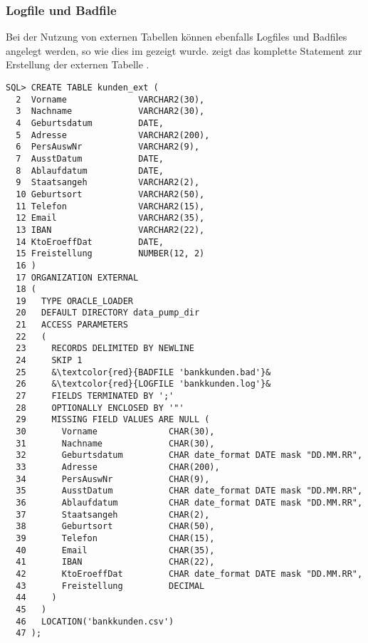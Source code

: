         \subsubsection{Logfile und Badfile}
          Bei der Nutzung von externen Tabellen k\"onnen ebenfalls Logfiles und Badfiles angelegt werden, so wie dies im  gezeigt wurde.  zeigt das komplette Statement zur Erstellung der externen Tabelle .
\clearpage
          \begin{lstlisting}[caption={Logfile und Badfile},label=admin929,language=oracle_sql]
SQL> CREATE TABLE kunden_ext (
  2  Vorname              VARCHAR2(30),
  3  Nachname             VARCHAR2(30),
  4  Geburtsdatum         DATE,
  5  Adresse              VARCHAR2(200),
  6  PersAuswNr           VARCHAR2(9),
  7  AusstDatum           DATE,
  8  Ablaufdatum          DATE,
  9  Staatsangeh          VARCHAR2(2),
  10 Geburtsort           VARCHAR2(50),
  11 Telefon              VARCHAR2(15),
  12 Email                VARCHAR2(35),
  13 IBAN                 VARCHAR2(22),
  14 KtoEroeffDat         DATE,
  15 Freistellung         NUMBER(12, 2)
  16 )
  17 ORGANIZATION EXTERNAL
  18 (
  19   TYPE ORACLE_LOADER
  20   DEFAULT DIRECTORY data_pump_dir
  21   ACCESS PARAMETERS
  22   (
  23     RECORDS DELIMITED BY NEWLINE
  24     SKIP 1
  25     &\textcolor{red}{BADFILE 'bankkunden.bad'}&
  26     &\textcolor{red}{LOGFILE 'bankkunden.log'}&
  27     FIELDS TERMINATED BY ';'
  28     OPTIONALLY ENCLOSED BY '"'
  29     MISSING FIELD VALUES ARE NULL (
  30       Vorname              CHAR(30),
  31       Nachname             CHAR(30),
  32       Geburtsdatum         CHAR date_format DATE mask "DD.MM.RR",
  33       Adresse              CHAR(200),
  34       PersAuswNr           CHAR(9),
  35       AusstDatum           CHAR date_format DATE mask "DD.MM.RR",
  36       Ablaufdatum          CHAR date_format DATE mask "DD.MM.RR",
  37       Staatsangeh          CHAR(2),
  38       Geburtsort           CHAR(50),
  39       Telefon              CHAR(15),
  40       Email                CHAR(35),
  41       IBAN                 CHAR(22),
  42       KtoEroeffDat         CHAR date_format DATE mask "DD.MM.RR",
  43       Freistellung         DECIMAL
  44     )
  45   )
  46   LOCATION('bankkunden.csv')
  47 );
          \end{lstlisting}
          \begin{literaturinternet}
            \item \cite{b28319et_params}
          \end{literaturinternet}
